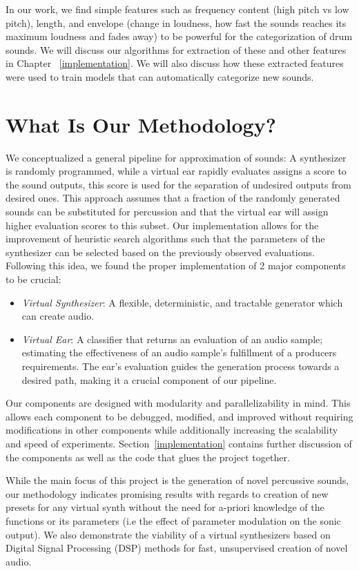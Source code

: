 \documentclass[\main/thesis.tex]{subfiles}
\begin{document}
In our work, we find simple features such as frequency content (high pitch vs low pitch), length, and envelope (change in loudness, how fast the sounds reaches its maximum loudness and fades away) to be powerful for the categorization of drum sounds. We will discuss our algorithms for extraction of these and other features in Chapter ~\ref{implementation}. We will also discuss how these extracted features were used to train models that can automatically categorize new sounds.  
\section{What Is Our Methodology?}
\label{sec_methodology}
We conceptualized a general pipeline for approximation of sounds: A synthesizer is randomly programmed, while a virtual ear rapidly evaluates assigns a score to the sound outputs, this score is used for the separation of undesired outputs from desired ones. This approach assumes that a fraction of the randomly generated sounds can be substituted for percussion and that the virtual ear will assign higher evaluation scores to this subset. Our implementation allows for the improvement of heuristic search algorithms such that the parameters of the synthesizer can be selected based on the previously observed evaluations. Following this idea, we found the proper implementation of 2 major components to be crucial:

\begin{itemize}
    \item \textit{Virtual Synthesizer}: A flexible, deter\-min\-istic, and tract\-able gener\-ator which can create audio. 
    \item \textit{Virtual Ear}: A classifier that returns an evaluation of an audio sample; estimating the effectiveness of an audio sample's fulfillment of a producers requirements. The ear's evaluation guides the generation process towards a desired path, making it a crucial component of our pipeline. 
\end{itemize}

Our components are designed with modularity and parallelizability in mind. This allows each component to be debugged, modified, and improved without requiring modifications in other components while additionally increasing the scalability and speed of experiments. 
Section~\ref{implementation} contains further discussion of the components as well as the code that glues the project together.

While the main focus of this project is the generation of novel percussive sounds, our methodology indicates promising results with regards to creation of new presets for any virtual synth without the need for a-priori knowledge of the functions or its parameters (i.e the effect of parameter modulation on the sonic output). We also demonstrate the viability of a virtual synthesizers based on Digital Signal Processing (DSP) methods for fast, unsupervised creation of novel audio. 
\end{document}
